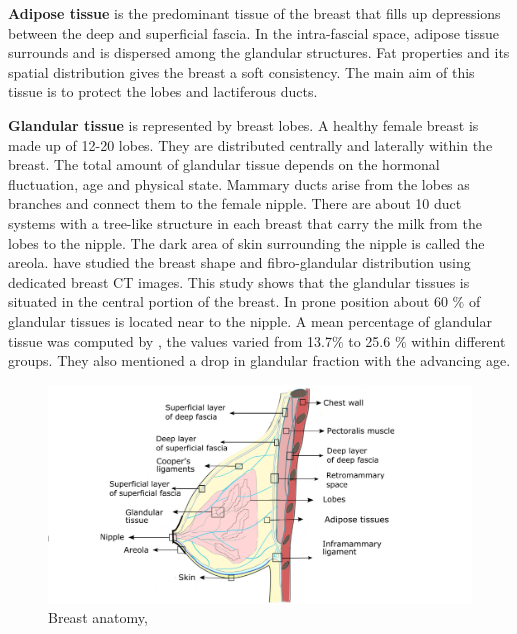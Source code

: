  \textbf{Adipose tissue} is the predominant tissue of the breast that fills up depressions between the deep and superficial fascia. In the intra-fascial space, adipose tissue surrounds and is dispersed among the glandular structures. Fat properties and its spatial distribution gives the breast a soft consistency. The main aim of this tissue is to protect the lobes and lactiferous ducts.

\textbf{Glandular tissue} is represented by breast lobes. A healthy female breast is made up of 12-20 lobes. They are distributed centrally and laterally within the breast. The total amount of glandular tissue depends on the hormonal fluctuation, age and physical state.  Mammary ducts arise from the lobes as branches and connect them to the female nipple. There are about 10 duct systems with a tree-like structure in each breast that carry the milk from the lobes to the nipple. The dark area of skin surrounding the nipple is called the areola. \cite{huang2011characterization} have studied the breast shape and fibro-glandular distribution using dedicated breast CT images. This study shows that the glandular tissues is situated in the central portion of the breast. In prone position about 60 $\%$ of glandular tissues is located near to the nipple. A mean percentage of glandular tissue was computed by \cite{yaffe2009myth}, the values varied from 13.7$\%$ to 25.6 $\%$ within different groups. They also mentioned a drop in glandular fraction with the advancing age. 


\begin{center}
\begin{figure}[h]
\includegraphics[width=\textwidth,keepaspectratio]{figures/anatomieSeinEuBlack2.png} 
\caption{Breast anatomy, \citep{clemente2011anatomy}}
\label{fig:breastanatomy}
\end{figure}
\end{center}

